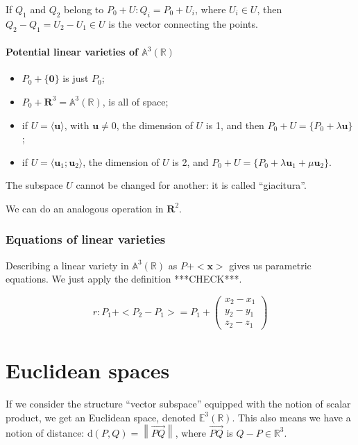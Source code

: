 \documentclass[12pt,a4paper]{report}
\newcommand{\norm}[1]{\left\lVert#1\right\rVert}
\numberwithin{equation}{section}
\theoremstyle{definition}
\theoremstyle{remark}
\begin{document}
If $Q_1$ and $Q_2$ belong to $P_0 + U: Q_i = P_0 + U_i$, where $U_i \in U$, then $Q_2-Q_1 = U_2 - U_1 \in U$ is the vector connecting the points.

\paragraph{Potential linear varieties of $\mathbb{A}^3 (\mathbb{R})$}

\begin{itemize}
\item $P_0 +\lbrace \mathbf{0}\rbrace$ is just $P_0$;
\item $P_0 + \mathbf{R}^3 = \mathbb{A}^3 (\mathbb{R})$, is all of space;
\item if $U = \langle\mathbf{u}\rangle$, with $\mathbf{u}\neq 0$, the dimension of $U$ is 1, and then $P_0 + U = \lbrace P_0 + \lambda \mathbf{u}\rbrace$;
\item if $U = \langle\mathbf{u}_1; \mathbf{u}_2\rangle$, the dimension of $U$ is 2, and $P_0 + U = \lbrace P_0 + \lambda \mathbf{u}_1 + \mu \mathbf{u}_2\rbrace$.
\end{itemize}

The subspace $U$ cannot be changed for another: it is called ``giacitura''.

We can do an analogous operation in $\mathbf{R}^2$.

\subsubsection{Equations of linear varieties}

Describing a linear variety in $\mathbb{A}^3 (\mathbb{R})$ as $P + <\mathbf{x}>$ gives us parametric equations.
We just apply the definition ***CHECK***.

\begin{equation}
r: P_1 + <P_2 - P_1> = P_1 + \begin{pmatrix}
x_2 - x_1 \\
y_2 - y_1 \\
z_2 - z_1 
\end{pmatrix}
\end{equation}

\section{Euclidean spaces}

If we consider the structure ``vector subspace'' equipped with the notion of scalar product, we get an Euclidean space, denoted $\mathbb{E} ^3 (\mathbb{R})$. This also means we have a notion of distance: $\text{d}(P, Q) = \norm{\overrightarrow{PQ}}$, where $\overrightarrow{PQ}$ is $Q-P \in \mathbb{R}^3$.
\end{document}
